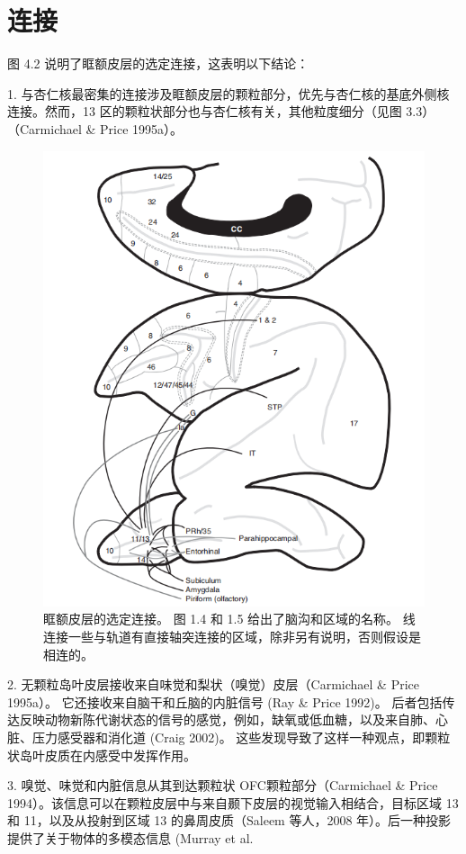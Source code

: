 \section{连接}
图 4.2 说明了眶额皮层的选定连接，这表明以下结论：\par
1. 与杏仁核最密集的连接涉及眶额皮层的颗粒部分，优先与杏仁核的基底外侧核连接。然而，13 区的颗粒状部分也与杏仁核有关，其他粒度细分（见图 3.3）（Carmichael \& Price 1995a）。\par
\begin{figure}[!htb]
	\centering
	\includegraphics{image_pfc/Fig_4_2}
	\caption{眶额皮层的选定连接。 图 1.4 和 1.5 给出了脑沟和区域的名称。 线连接一些与轨道有直接轴突连接的区域，除非另有说明，否则假设是相连的。}
\end{figure}
2. 无颗粒岛叶皮层接收来自味觉和梨状（嗅觉）皮层（Carmichael \& Price 1995a）。 它还接收来自脑干和丘脑的内脏信号 (Ray \& Price 1992)。 后者包括传达反映动物新陈代谢状态的信号的感觉，例如，缺氧或低血糖，以及来自肺、心脏、压力感受器和消化道 (Craig 2002)。 这些发现导致了这样一种观点，即颗粒状岛叶皮质在内感受中发挥作用。\par
3. 嗅觉、味觉和内脏信息从其到达颗粒状 OFC颗粒部分（Carmichael \& Price 1994）。该信息可以在颗粒皮层中与来自颞下皮层的视觉输入相结合，目标区域 13和 11，以及从投射到区域 13 的鼻周皮质（Saleem 等人，2008 年）。后一种投影提供了关于物体的多模态信息 (Murray et al.
